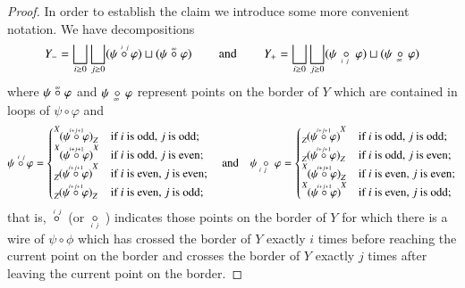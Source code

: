 \documentclass{amsart}
\def\tn{\textnormal}
\def\hsp{\hspace{.3in}}
\newcommand{\inp}[1]{{#1_-}}
\newcommand{\outp}[1]{{#1_+}}
\newcommand{\feeddd}[3]{{\tensor*[^{#2}_{\color{white}{!}}]{{#1}}{^{#3}}}}%
\newcommand{\feeddc}[3]{{\tensor*[^{#2}]{{#1}}{_{#3}}}}
\newcommand{\feedcd}[3]{{\tensor*[_{#2}]{{#1}}{^{#3}}}}
\newcommand{\feedcc}[3]{{\tensor*[^{\color{white}{!}}_{#2}]{{#1}}{_{#3}}}}
\theoremstyle{remark}
\theoremstyle{definition}
\begin{document}
\begin{proof}
In order to establish the claim we introduce some more convenient notation.  We have decompositions
\[\inp{Y}=\bigsqcup_{i\ge0}\bigsqcup_{j\ge0}(\psi\;\accentset{\,i\ j}{\circ}\;\varphi)\sqcup(\psi\;\accentset{\infty}{\circ}\;\varphi)\hsp\tn{and}\hsp \outp{Y}=\bigsqcup_{i\ge0}\bigsqcup_{j\ge0}(\psi\;\underaccent{\,\ i\ j}{\circ}\;\varphi)\sqcup(\psi\,\underaccent{\;\ \infty}{\circ}\,\varphi)\]
where $\psi\;\accentset{\infty}{\circ}\;\varphi$ and $\psi\,\underaccent{\ \;\infty}{\circ}\,\varphi$ represent points on the border of $Y$ which are contained in loops of $\psi\circ\varphi$ and
\[\psi\;\accentset{\,i\ j}{\circ}\;\varphi=\begin{cases}\feeddc{(\psi\;\accentset{i+j+1}{\circ}\;\varphi)}{X}{Z} & \text{if $i$ is odd, $j$ is odd;}\\\feeddd{(\psi\;\accentset{i+j+1}{\circ}\;\varphi)}{X}{X} & \text{if $i$ is odd, $j$ is even;}\\\feedcd{(\psi\;\accentset{i+j+1}{\circ}\;\varphi)}{Z}{X} & \text{if $i$ is even, $j$ is even;}\\\feedcc{(\psi\;\accentset{i+j+1}{\circ}\;\varphi)}{Z}{Z} & \text{if $i$ is even, $j$ is odd;}\end{cases}
\quad\tn{and}\quad
\psi\;\underaccent{i\ j}{\circ}\;\varphi=\begin{cases}\feedcd{(\psi\;\accentset{i+j+1}{\circ}\;\varphi)}{Z}{X} & \text{if $i$ is odd, $j$ is odd;}\\\feedcc{(\psi\;\accentset{i+j+1}{\circ}\;\varphi)}{Z}{Z} & \text{if $i$ is odd, $j$ is even;}\\\feeddc{(\psi\;\accentset{i+j+1}{\circ}\;\varphi)}{X}{Z} & \text{if $i$ is even, $j$ is even;}\\\feeddd{(\psi\;\accentset{i+j+1}{\circ}\;\varphi)}{X}{X} & \text{if $i$ is even, $j$ is odd;}\end{cases}\]
that is, $\ \accentset{\,i\ j}{\circ}\ $ (or $\ \underaccent{\,i\ j}{\circ}\,$ ) indicates those points on the border of $Y$ for which there is a wire of $\psi\circ\phi$ which has crossed the border of $Y$ exactly $i$ times before reaching the current point on the border and crosses the border of $Y$ exactly $j$ times after leaving the current point on the border.


\end{proof}
\end{document}

